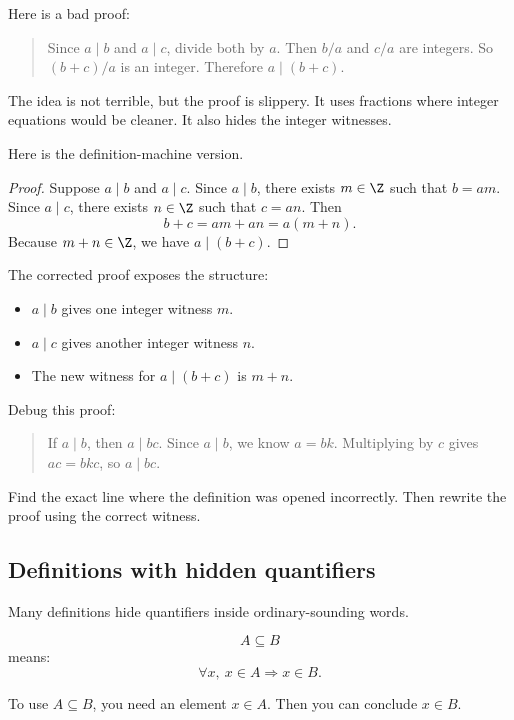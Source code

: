 Here is a bad proof:

\begin{quote}
Since $a\mid b$ and $a\mid c$, divide both by $a$. Then $b/a$ and $c/a$ are integers. So $(b+c)/a$ is an integer. Therefore $a\mid(b+c)$.
\end{quote}

The idea is not terrible, but the proof is slippery. It uses fractions where integer equations would be cleaner. It also hides the integer witnesses.

Here is the definition-machine version.

\begin{proof}
Suppose $a\mid b$ and $a\mid c$. Since $a\mid b$, there exists $m\in\Z$ such that $b=am$. Since $a\mid c$, there exists $n\in\Z$ such that $c=an$. Then
\[
b+c=am+an=a(m+n).
\]
Because $m+n\in\Z$, we have $a\mid(b+c)$.
\end{proof}

The corrected proof exposes the structure:

\begin{itemize}
\item $a\mid b$ gives one integer witness $m$.
\item $a\mid c$ gives another integer witness $n$.
\item The new witness for $a\mid(b+c)$ is $m+n$.
\end{itemize}

\begin{labbox}
Debug this proof:

\begin{quote}
If $a\mid b$, then $a\mid bc$. Since $a\mid b$, we know $a=bk$. Multiplying by $c$ gives $ac=bkc$, so $a\mid bc$.
\end{quote}

Find the exact line where the definition was opened incorrectly. Then rewrite the proof using the correct witness.
\end{labbox}

\subsection{Definitions with hidden quantifiers}

Many definitions hide quantifiers inside ordinary-sounding words.

\[
A\subseteq B
\]
means:
\[
\forall x,\ x\in A\Rightarrow x\in B.
\]

To use $A\subseteq B$, you need an element $x\in A$. Then you can conclude $x\in B$.

